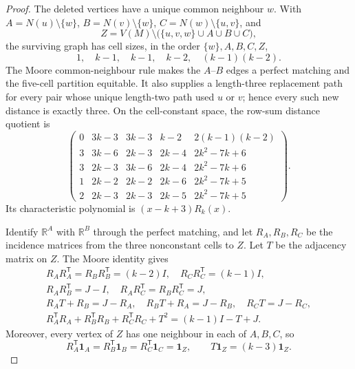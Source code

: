 \documentclass[10pt,a4paper]{amsart}
\newcommand{\one}{\mathbf 1}
\begin{document}
\begin{proof}
The deleted vertices have a unique common neighbour \(w\).  With
\(A=N(u)\setminus\{w\}\), \(B=N(v)\setminus\{w\}\),
\(C=N(w)\setminus\{u,v\}\), and
\[
 Z=V(M)\setminus\bigl(\{u,v,w\}\cup A\cup B\cup C\bigr),
\]
the surviving graph has cell sizes, in the order \(\{w\},A,B,C,Z\),
\[
 1,\quad k-1,\quad k-1,\quad k-2,\quad (k-1)(k-2).
\]
The Moore common-neighbour rule makes the \(A\)--\(B\) edges a perfect
matching and the five-cell partition equitable.  It also supplies a
length-three replacement path for every pair whose unique length-two path
used \(u\) or \(v\); hence every such new distance is exactly three.  On the
cell-constant space, the row-sum distance quotient is
\[
\begin{pmatrix}
0&3k-3&3k-3&k-2&2(k-1)(k-2)\\
3&3k-6&2k-3&2k-4&2k^2-7k+6\\
3&2k-3&3k-6&2k-4&2k^2-7k+6\\
1&2k-2&2k-2&2k-6&2k^2-7k+5\\
2&2k-3&2k-3&2k-5&2k^2-7k+5
\end{pmatrix}.
\]
Its characteristic polynomial is \((x-k+3)R_k(x)\).

Identify \(\mathbb R^A\) with \(\mathbb R^B\) through the perfect matching,
and let \(R_A,R_B,R_C\) be the incidence matrices from the three
nonconstant cells to \(Z\).  Let \(T\) be the adjacency matrix on \(Z\).
The Moore identity gives
\[
\begin{gathered}
R_AR_A^{\mathsf T}=R_BR_B^{\mathsf T}=(k-2)I,\quad
R_CR_C^{\mathsf T}=(k-1)I,\\
R_AR_B^{\mathsf T}=J-I,\quad
R_AR_C^{\mathsf T}=R_BR_C^{\mathsf T}=J,\\
R_AT+R_B=J-R_A,\quad
R_BT+R_A=J-R_B,\quad
R_CT=J-R_C,\\
R_A^{\mathsf T}R_A+R_B^{\mathsf T}R_B+R_C^{\mathsf T}R_C+T^2
=(k-1)I-T+J.
\end{gathered}
\]
Moreover, every vertex of \(Z\) has one neighbour in each of \(A,B,C\),
so
\[
 R_A^{\mathsf T}\one_A
 =R_B^{\mathsf T}\one_B
 =R_C^{\mathsf T}\one_C
 =\one_Z,
 \qquad T\one_Z=(k-3)\one_Z.
\]


\end{proof}
\end{document}
